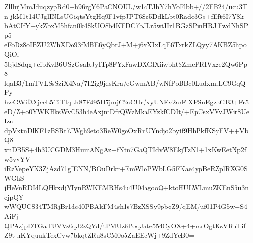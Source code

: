 ZlllujMmJduqzypRd0+h96rgY6PaCNOUL/w1cTJhY7hYoFlbb+//2FB24/ucu3Tn
jkM1t14UJglINLsUGiqtsYtgHq9F1vfpJPT6Sz5DdkLbt0Radc3Gs+fEft6I7Y8k
bAtCIfY+ykZbxM5hfan0k4SkUO8b4KFDC7bJLr5wiJIr1BGzSPmHRJlFwdNhSPp5
eFoDz8oIBZU2WhXDo93fMBE6yQbrJ+M+j6vXIxLqE6TxrkZLQyy7AKBZ5hpoQiOf
5bjd8dqg+cibKvB6USgGsaKJyITp8FYxFawDXGlXiiwbhtSZmePRIVxze2Qw6Pp8
lqaB3/1mTVLSsSziX4Na/7h2ig9jdsKra/eGwmAB/wNfPoBBc0LudxmrLC9GqQPy
hwGWif3Xjceb5CiTIqLh87F495H7jmjC2aCUr/xyUNEv2arFlXPSnEgzoGB3+Fr5
eD/Z+o0YWKBksWvC53h4eAxjntDfrQWzMkaEYzkfCDIt/+EpCsxVVvJWir8UeIzc
dpVxtnDlKF1zBSRt7JWgh9eto3ReW0goOxRnUYndjo2bytf9HhPkfKSyFV++VbQ8
xnDB5S+4h3UCGDM3HumANgAz+fNtn7GaQTIdvW8EkjTzN1+1xKwEetNp2fw5vvYV
iRzVepeYN3ZjAzd71gIENN/BOuDrkr+EmWloPWbLG5FKae4ypBeRZplRXG0SWGhS
jHeVnRDIdLQHkxdjYIynRWKEMRHs4u4U04agooQ+ktoHULWLmuZKEnS6u3ncjpQY
wWQUCS34TMRjBr1dc40PBAkFM4sh1s7BzXSSy9pbcZ9/qEM/uf01P4G5w+S4AiFj
QPAzjpDTGaTUVVs0qJ2zQYd/tPMUz8PoqJate554CyOX+4+rcrOgtKsVRuTifZ9t
nKYquukTexCvw7bkqtZRu8sCM0o5ZaEEeWj+9ZdYeB0=
